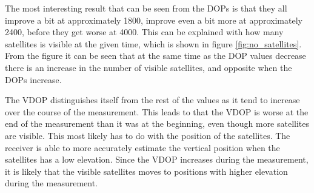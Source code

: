 \documentclass{article}
\begin{document}
The most interesting result that can be seen from the DOPs is that they all improve a bit at approximately 1800, improve even a bit more at approximately 2400, before they get worse at 4000. This can be explained with how many satellites is visible at the given time, which is shown in figure \ref{fig:no_satellites}. From the figure it can be seen that at the same time as the DOP values decrease there is an increase in the number of visible satellites, and opposite when the DOPs increase.

The VDOP distinguishes itself from the rest of the values as it tend to increase over the course of the measurement. This leads to that the VDOP is worse at the end of the measurement than it was at the beginning, even though more satellites are visible. This most likely has to do with the position of the satellites. The receiver is able to more accurately estimate the vertical position when the satellites has a low elevation. Since the VDOP increases during the measurement, it is likely that the visible satellites moves to positions with higher elevation during the measurement.
\end{document}
